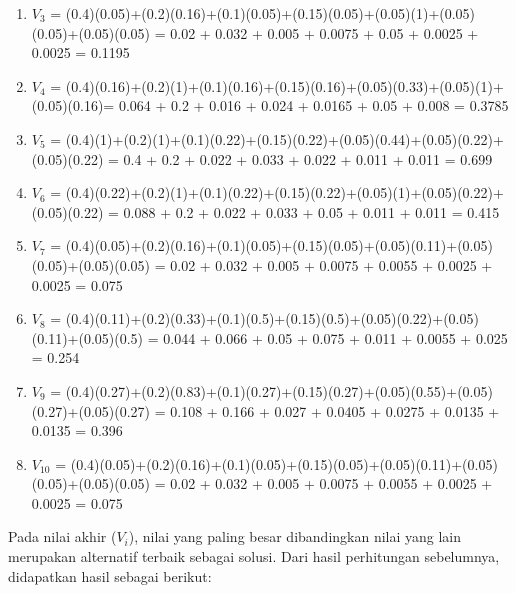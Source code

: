 \documentclass[a4paper,twoside]{article}
\begin{document}
\begin{enumerate}
\begin{enumerate}
	\item $V_{3}$ = (0.4)(0.05)+(0.2)(0.16)+(0.1)(0.05)+(0.15)(0.05)+(0.05)(1)+(0.05)(0.05)+(0.05)(0.05) = 0.02 + 0.032 + 0.005 + 0.0075 + 0.05 + 0.0025 + 0.0025 = 0.1195
	
	\item $V_{4}$ = (0.4)(0.16)+(0.2)(1)+(0.1)(0.16)+(0.15)(0.16)+(0.05)(0.33)+(0.05)(1)+(0.05)(0.16)= 0.064 + 0.2 + 0.016 + 0.024 + 0.0165 + 0.05 + 0.008 = 0.3785
	
	\item $V_{5}$ = (0.4)(1)+(0.2)(1)+(0.1)(0.22)+(0.15)(0.22)+(0.05)(0.44)+(0.05)(0.22)+(0.05)(0.22) = 0.4 + 0.2 + 0.022 + 0.033 + 0.022 + 0.011 + 0.011 = 0.699
	
	\item $V_{6}$ = (0.4)(0.22)+(0.2)(1)+(0.1)(0.22)+(0.15)(0.22)+(0.05)(1)+(0.05)(0.22)+(0.05)(0.22) = 0.088 + 0.2 + 0.022 + 0.033 + 0.05 + 0.011 + 0.011 = 0.415
	
	\item $V_{7}$ = (0.4)(0.05)+(0.2)(0.16)+(0.1)(0.05)+(0.15)(0.05)+(0.05)(0.11)+(0.05)(0.05)+(0.05)(0.05) = 0.02 + 0.032 + 0.005 + 0.0075 + 0.0055 + 0.0025 + 0.0025 = 0.075
	
	\item $V_{8}$ = (0.4)(0.11)+(0.2)(0.33)+(0.1)(0.5)+(0.15)(0.5)+(0.05)(0.22)+(0.05)(0.11)+(0.05)(0.5) = 0.044 + 0.066 + 0.05 + 0.075 + 0.011 + 0.0055 + 0.025 = 0.254
	
	\item $V_{9}$ = (0.4)(0.27)+(0.2)(0.83)+(0.1)(0.27)+(0.15)(0.27)+(0.05)(0.55)+(0.05)(0.27)+(0.05)(0.27) = 0.108 + 0.166 + 0.027 + 0.0405 + 0.0275 + 0.0135 + 0.0135 = 0.396
	
	\item $V_{10}$ = (0.4)(0.05)+(0.2)(0.16)+(0.1)(0.05)+(0.15)(0.05)+(0.05)(0.11)+(0.05)(0.05)+(0.05)(0.05) = 0.02 + 0.032 + 0.005 + 0.0075 + 0.0055 + 0.0025 + 0.0025 = 0.075
\end{enumerate}

Pada nilai akhir ($V_{i}$), nilai yang paling besar dibandingkan nilai yang lain merupakan alternatif terbaik sebagai solusi. Dari hasil perhitungan sebelumnya, didapatkan hasil sebagai berikut:


\end{enumerate}
\end{document}
